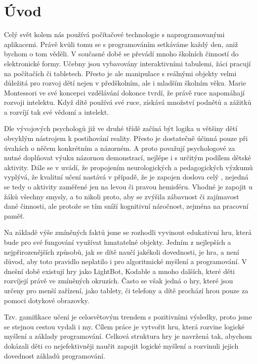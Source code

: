 \chapter{Úvod}

Celý svět kolem nás používá počítačové technologie s naprogramovanými aplikacemi. Právě kvůli tomu se s programováním setkáváme každý den, aniž bychom o tom věděli. V současné době se převádí mnoho školních činností do elektronické formy. Učebny jsou vybavovány interaktivními tabulemi, žáci pracují na počítačích či tabletech. Přesto je ale manipulace s reálnými objekty velmi důležitá pro rozvoj dětí nejen v předškolním, ale i mladším školním věku. Marie Montessori ve své koncepci vzdělávání dokonce tvrdí, že právě ruce napomáhají rozvoji intelektu. Když dítě používá své ruce, získává množství podnětů a zážitků a rozvíjí tak své vědomí a intelekt.\cite{Montessori}
\par
Dle vývojových psychologů\cite{VyvojovaPsychologie} již ve druhé třídě začíná být logika u většiny dětí obvyklým nástrojem k postihování reality. Přesto je dostatečně účinná pouze při úvahách o něčem konkrétním a názorném. A proto považují psychologové za nutné doplňovat výuku názornou demonstrací, nejlépe i s určitým podílem dětské aktivity. Dále se v \cite{ASE} uvádí, že propojením neurologických a pedagogických výzkumů vyplývá, že kvalitní učení nastává v případě, že je zapojen doslova celý  , nejedná se tedy o aktivity zaměřené jen na levou či pravou hemisféru. Vhodné je zapojit u žáků všechny smysly, a to nikoli proto, aby se zvýšila zábavnost či zajímavost dané činnosti, ale protože se tím sníží kognitivní náročnost, zejména na pracovní paměť.
\par
Na základě výše zmíněných faktů jsme se rozhodli vyvinout edukativní hru, která bude pro své fungování využívat hmatatelné objekty. Jedním z nejlepších a nejpřirozenějších způsobů, jak se dítě naučí jakékoli dovednosti, je hra, a není důvod, aby toto pravidlo neplatilo i pro algoritmické myšlení a programování. V dnešní době existují hry jako LightBot, Kodable a mnoho dalších, které děti rozvíjejí právě ve zmíněných okruzích. Často se však jedná o hry, které jsou určeny pro menší zařízení, jako tablety, či telefony a dítě prochází hrou pouze za pomoci dotykové obrazovky.
\par
Tzv. gamifikace učení je celosvětovým trendem s pozitivními výsledky, proto jsme se stejnou cestou vydali i my. Cílem práce je vytvořit hru, která rozvine logické myšlení a základy programování. Celková struktura hry je navržená tak, abychom dokázali děti co nejefektivněji naučit zapojit logické myšlení a rozvinuli jejich dovednost základů programování.